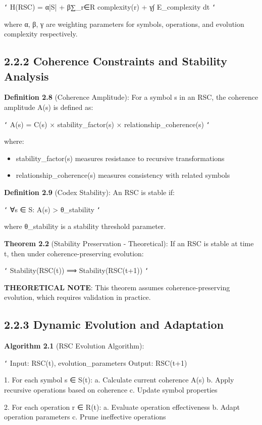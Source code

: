 \texttt{`}
H(RSC) = α|S| + β∑_{r∈R} complexity(r) + γ∫ E_complexity dt
\texttt{`}

where α, β, γ are weighting parameters for symbols, operations, and evolution complexity respectively.

\subsection{2.2.2 Coherence Constraints and Stability Analysis}

\textbf{Definition 2.8} (Coherence Amplitude): For a symbol s in an RSC, the coherence amplitude A(s) is defined as:

\texttt{`}
A(s) = C(s) × stability_factor(s) × relationship_coherence(s)
\texttt{`}

where:
\begin{itemize}
\item stability_factor(s) measures resistance to recursive transformations
\item relationship_coherence(s) measures consistency with related symbols
\end{itemize}

\textbf{Definition 2.9} (Codex Stability): An RSC is stable if:

\texttt{`}
∀s ∈ S: A(s) > θ_stability
\texttt{`}

where θ_stability is a stability threshold parameter.

\textbf{Theorem 2.2} (Stability Preservation - Theoretical): If an RSC is stable at time t, then under coherence-preserving evolution:

\texttt{`}
Stability(RSC(t)) ⟹ Stability(RSC(t+1))
\texttt{`}

\textbf{THEORETICAL NOTE}: This theorem assumes coherence-preserving evolution, which requires validation in practice.

\subsection{2.2.3 Dynamic Evolution and Adaptation}

\textbf{Algorithm 2.1} (RSC Evolution Algorithm):

\texttt{`}
Input: RSC(t), evolution_parameters
Output: RSC(t+1)

1. For each symbol s ∈ S(t):
   a. Calculate current coherence A(s)
   b. Apply recursive operations based on coherence
   c. Update symbol properties
   
2. For each operation r ∈ R(t):
   a. Evaluate operation effectiveness
   b. Adapt operation parameters
   c. Prune ineffective operations
   

